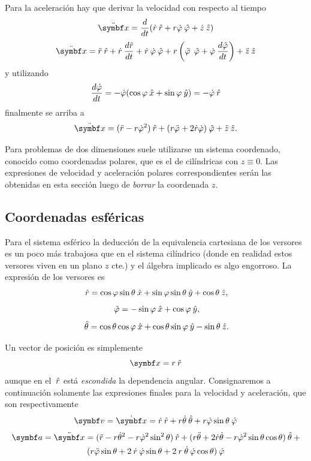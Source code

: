 \documentclass[10pt,oneside]{CBFT_book}
\begin{document}
Para la aceleración hay que derivar la velocidad con respecto al tiempo
\[
	\ddot{\vb{x}} = \dtot{}{t} ( \dot{r} \: \hat{r} + r\dot{\vp} \: \hat{\vp} + \dot{z} \:\hat{z} ) 
\]
\[
	\ddot{\vb{x}} = \ddot{r} \:\hat{r} + \dot{r} \: \dtot{\hat{r}}{t} + \dot{r} \: \dot{\vp} \: \hat{\vp}
	+ r \left( \ddot{\vp} \: \phiver + \dot{\vp} \: \dtot{\hat{\vp}}{t} \right) + \ddot{z} \:\hat{z}
\]
y utilizando 
\[
	\frac{d^{\hspace{-0.05em}} {\hat{\varphi}}}{d {t}^{\hspace{-0.05em}}} = - \dot{ \varphi } ( \cos \varphi \:\hat{x} + \sin  \varphi \:\hat{y} ) = - \dot{\varphi} \: \hat{r}
\]
finalmente se arriba a
\[
	\ddot{\vb{x}} = ( \ddot{r} - r\dot{\vp}^2 ) \rver + ( r\ddot{\vp} + 2 \dot{r} \dot{\vp} ) \phiver + \ddot{z} \:\hat{z}.
\]

Para problemas de dos dimensiones suele utilizarse un sistema coordenado, conocido como coordenadas polares, que es el 
de cilíndricas con $ z \equiv 0 $. Las expresiones de velocidad y aceleración polares correspondientes serán las 
obtenidas en esta sección luego de {\it borrar} la coordenada $z$.

\subsection{Coordenadas esféricas}

Para el sistema esférico la deducción de la equivalencia cartesiana de los versores es un poco más trabajosa que en el 
sistema cilíndrico (donde en realidad estos versores viven en un plano $z$ cte.) y el álgebra implicado es algo 
engorroso. La expresión de los versores es
\[
	\:\hat{r} = \cos\varphi \sin\theta\:\hat{x} + \sin\varphi\sin\theta\:\hat{y} + \cos\theta\:\hat{z},
\]
\[
	\:\hat{\varphi} = -\sin\varphi \:\hat{x} + \cos\varphi \:\hat{y},
\]
\[
	\:\hat{\theta} = \cos\theta \cos\varphi \:\hat{x} + \cos\theta\sin\varphi\:\hat{y} - \sin\theta\:\hat{z}.
\]

Un vector de posición es simplemente
\[
	\vb{x} = r \rver
\]
aunque en el $\:\hat{r}$ está {\it escondida} la dependencia angular. Consignaremos a continuación solamente las 
expresiones finales para la velocidad y aceleración, que son respectivamente
\[
	\vb{v} = \dot{\vb{x}} = \dot{r} \rver + r\dot{\theta}\thetaver + r\dot{\vp}\sin\theta\phiver
\]
\begin{multline*} %
	\!\: \vb{a} = \ddot{\vb{x}} = ( \ddot{r} - r\dot{\theta}^2 - r\dot{\vp}^2 \sin^2 \theta )\rver +
	( r\ddot{\theta} + 2\dot{r}\dot{\theta} - r\dot{\vp}^2 \sin \theta \cos\theta )\thetaver \: + \\
	( r \ddot{\vp}\sin\theta + 2 \: \dot{r} \: \dot{\vp} \sin\theta + 2 \: r \:\dot{\theta} \:\dot{\vp} \cos\theta )\phiver 
\end{multline*}
	
\end{document}
